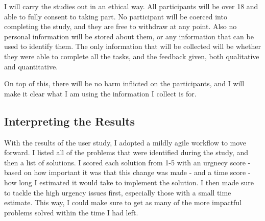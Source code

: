I will carry the studies out in an ethical way. All participants will be over 18 and able to fully consent to taking part. No participant will be coerced into completing the study, and they are free to withdraw at any point. Also no personal information will be stored about them, or any information that can be used to identify them. The only information that will be collected will be whether they were able to complete all the tasks, and the feedback given, both qualitative and quantitative.

On top of this, there will be no harm inflicted on the participants, and I will make it clear what I am using the information I collect is for. 

\subsection{Interpreting the Results}

With the results of the user study, I adopted a mildly agile workflow to move forward. I listed all of the problems that were identified during the study, and then a list of solutions. I scored each solution from 1-5 with an urgnecy score - based on how important it was that this change was made - and a time score - how long I estimated it would take to implement the solution. I then made sure to tackle the high urgency issues first, especially those with a small time estimate. This way, I could make sure to get as many of the more impactful problems solved within the time I had left. 

